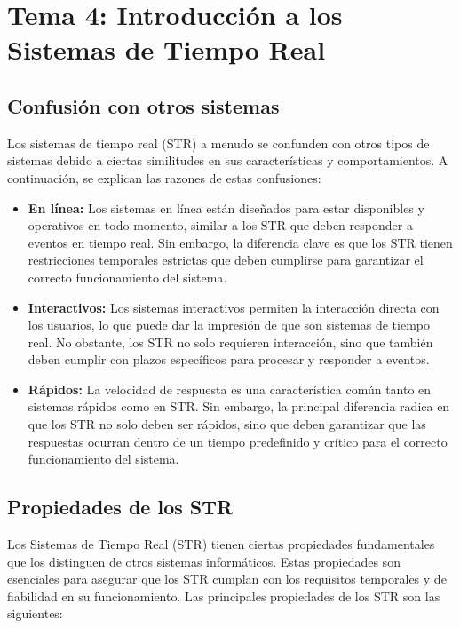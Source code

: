 \documentclass[a4paper,12pt]{article}
\begin{document}

\section{Tema 4: Introducción a los Sistemas de Tiempo Real}

\subsection{Confusión con otros sistemas}

Los sistemas de tiempo real (STR) a menudo se confunden con otros tipos de sistemas debido a ciertas similitudes en sus características y comportamientos. A continuación, se explican las razones de estas confusiones:

\begin{itemize}
    \item \textbf{En línea:} Los sistemas en línea están diseñados para estar disponibles y operativos en todo momento, similar a los STR que deben responder a eventos en tiempo real. Sin embargo, la diferencia clave es que los STR tienen restricciones temporales estrictas que deben cumplirse para garantizar el correcto funcionamiento del sistema.
    \item \textbf{Interactivos:} Los sistemas interactivos permiten la interacción directa con los usuarios, lo que puede dar la impresión de que son sistemas de tiempo real. No obstante, los STR no solo requieren interacción, sino que también deben cumplir con plazos específicos para procesar y responder a eventos.
    \item \textbf{Rápidos:} La velocidad de respuesta es una característica común tanto en sistemas rápidos como en STR. Sin embargo, la principal diferencia radica en que los STR no solo deben ser rápidos, sino que deben garantizar que las respuestas ocurran dentro de un tiempo predefinido y crítico para el correcto funcionamiento del sistema.
\end{itemize}

\subsection{Propiedades de los STR}

Los Sistemas de Tiempo Real (STR) tienen ciertas propiedades fundamentales que los distinguen de otros sistemas informáticos. Estas propiedades son esenciales para asegurar que los STR cumplan con los requisitos temporales y de fiabilidad en su funcionamiento. Las principales propiedades de los STR son las siguientes:
\end{document}
